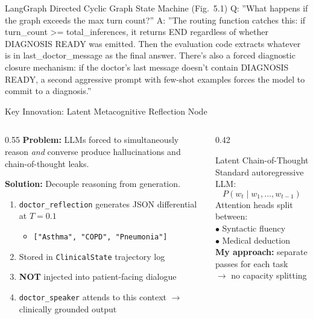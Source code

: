 \documentclass[aspectratio=169,11pt]{beamer}
\begin{document}
\begin{frame}{LangGraph Directed Cyclic Graph State Machine (Fig.\ 5.1)}
{Q: ''What happens if the graph exceeds the max turn count?''
A: ''The routing function catches this: if turn\_count >= total\_inferences, it returns END regardless of whether DIAGNOSIS READY was emitted. Then the evaluation code extracts whatever is in last\_doctor\_message as the final answer. There's also a forced diagnostic closure mechanism: if the doctor's last message doesn't contain DIAGNOSIS READY, a second aggressive prompt with few-shot examples forces the model to commit to a diagnosis.''
}
\end{frame}

\begin{frame}{Key Innovation: Latent Metacognitive Reflection Node}
\begin{columns}[T]
\begin{column}{0.55\textwidth}
\textbf{Problem:} LLMs forced to simultaneously reason \emph{and} converse produce hallucinations and chain-of-thought leaks.

\vspace{0.5em}
\textbf{Solution:} Decouple reasoning from generation.

\vspace{0.3em}
\begin{enumerate}
  \item \texttt{doctor\_reflection} generates JSON differential at $T{=}0.1$
  \begin{itemize}
    \item[\texttt{>}] \texttt{["Asthma", "COPD", "Pneumonia"]}
  \end{itemize}
  \item Stored in \texttt{ClinicalState} trajectory log
  \item \textbf{NOT} injected into patient-facing dialogue
  \item \texttt{doctor\_speaker} attends to this context $\rightarrow$ clinically grounded output
\end{enumerate}
\end{column}
\begin{column}{0.42\textwidth}
\begin{block}{\footnotesize Latent Chain-of-Thought}
\footnotesize
Standard autoregressive LLM:
\[P(w_t \mid w_1, \ldots, w_{t-1})\]
Attention heads split between:\\
\quad$\bullet$ Syntactic fluency\\
\quad$\bullet$ Medical deduction\\[0.3em]
\textbf{My approach:} separate passes for each task \\ $\rightarrow$ no capacity splitting
\end{block}
\end{column}
\end{columns}


\end{frame}
\end{document}
